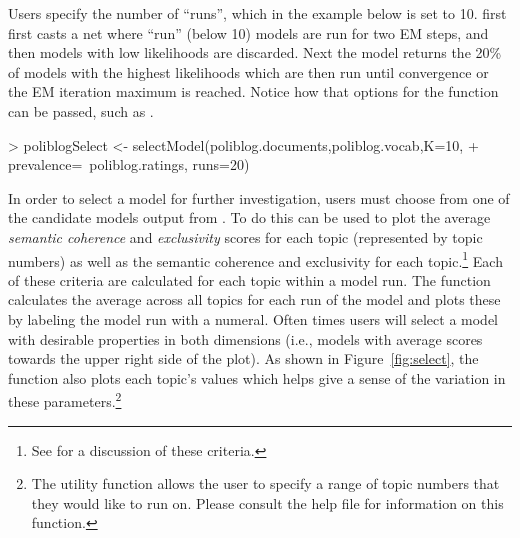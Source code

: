 \documentclass[nojss]{jss}
\begin{document}
Users specify the number of ``runs'', which in the example below is set to 10.  first first casts a net where ``run'' (below 10) models are run for two EM steps, and then models with low likelihoods are discarded. Next the model returns the 20\% of models with the highest likelihoods which are then run until convergence or the EM iteration maximum is reached. Notice how that options for the  function can be passed, such as .
\begin{Schunk}
\begin{Sinput}
> poliblogSelect <- selectModel(poliblog.documents,poliblog.vocab,K=10,
+                               prevalence=~poliblog.ratings, runs=20)
\end{Sinput}
\end{Schunk}

In order to select a model for further investigation, users must choose from one of the candidate models output from . To do this  can be used to plot the average \emph{semantic coherence} and \emph{exclusivity} scores for each topic (represented by topic numbers) as well as the semantic coherence and exclusivity for each topic.\footnote{See \citet{STMEdo,ajps} for a discussion of these criteria.} Each of these criteria are calculated for each topic within a model run. The  function calculates the average across all topics for each run of the model and plots these by labeling the model run with a numeral. Often times users will select a model with desirable properties in both dimensions (i.e., models with average scores towards the upper right side of the plot). As shown in Figure~\ref{fig:select}, the  function also plots each topic's values which helps give a sense of the variation in these parameters.\footnote{The utility function  allows the user to specify a range of topic numbers that they would like to run  on. Please consult the help file for information on this function.}
\end{document}
